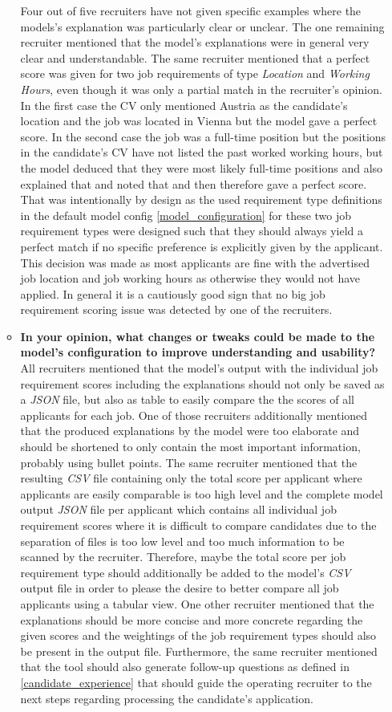 \documentclass[draft,final]{thesisclass} %
\begin{document}
\begin{enumerate}
\begin{itemize}
        Four out of five recruiters have not given specific examples where the models's explanation was particularly clear or unclear. The one remaining recruiter mentioned that the model's explanations were in general very clear and understandable. The same recruiter mentioned that a perfect score was given for two job requirements of type \textit{Location} and \textit{Working Hours}, even though it was only a partial match in the recruiter's opinion. In the first case the \acs{CV} only mentioned Austria as the candidate's location and the job was located in Vienna but the model gave a perfect score. In the second case the job was a full-time position but the positions in the candidate's \acs{CV} have not listed the past worked working hours, but the model deduced that they were most likely full-time positions and also explained that and noted that and then therefore gave a perfect score. That was intentionally by design as the used requirement type definitions in the default model config \ref{model_configuration} for these two job requirement types were designed such that they should always yield a perfect match if no specific preference is explicitly given by the applicant. This decision was made as most applicants are fine with the advertised job location and job working hours as otherwise they would not have applied. In general it is a cautiously good sign that no big job requirement scoring issue was detected by one of the recruiters.
        \item \textbf{In your opinion, what changes or tweaks could be made to the model's configuration to improve understanding and usability?}
        All recruiters mentioned that the model's output with the individual job requirement scores including the explanations should not only be saved as a \textit{JSON} file, but also as table to easily compare the the scores of all applicants for each job. One of those recruiters additionally mentioned that the produced explanations by the model were too elaborate and should be shortened to only contain the most important information, probably using bullet points. The same recruiter mentioned that the resulting \textit{CSV} file containing only the total score per applicant where applicants are easily comparable is too high level and the complete model output \textit{JSON} file per applicant which contains all individual job requirement scores where it is difficult to compare candidates due to the separation of files is too low level and too much information to be scanned by the recruiter. Therefore, maybe the total score per job requirement type should additionally be added to the model's \textit{CSV} output file in order to please the desire to better compare all job applicants using a tabular view. One other recruiter mentioned that the explanations should be more concise and more concrete regarding the given scores and the weightings of the job requirement types should also be present in the output file. Furthermore, the same recruiter mentioned that the tool should also generate follow-up questions as defined in \ref{candidate_experience} that should guide the operating recruiter to the next steps regarding processing the candidate's application.

\end{itemize}
\end{enumerate}
\end{document}
